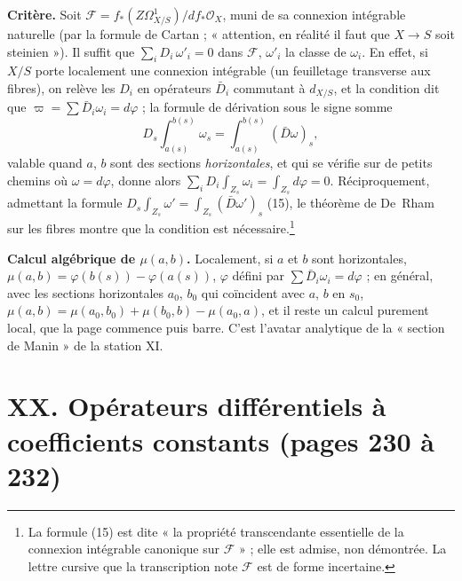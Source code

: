 \documentclass[11pt,a4paper]{article}
\begin{document}
\textbf{Critère.} Soit $\mathcal{F} = f_*(Z\Omega^1_{X/S})/d f_*\mathcal{O}_X$, muni de
sa connexion intégrable naturelle (par la formule de Cartan ; « attention,
en réalité il faut que $X \to S$ soit steinien »). Il suffit que
$\sum_i D_i\,\omega'_i = 0$ dans $\mathcal{F}$, $\omega'_i$ la classe de
$\omega_i$. En effet, si $X/S$ porte localement une connexion intégrable
(un feuilletage transverse aux fibres), on relève les $D_i$ en opérateurs
$\bar D_i$ commutant à $d_{X/S}$, et la condition dit que $\varpi = \sum \bar
D_i\omega_i = d\varphi$ ; la formule de dérivation sous le signe somme
\[
  D_s\int_{a(s)}^{b(s)}\omega_s = \int_{a(s)}^{b(s)} (\bar D\omega)_s ,
\]
valable quand $a$, $b$ sont des sections \emph{horizontales}, et qui se
vérifie sur de petits chemins où $\omega = d\varphi$, donne alors
$\sum_i D_i \int_{Z_s}\omega_i = \int_{Z_s}d\varphi = 0$. Réciproquement,
admettant la formule $D_s\int_{Z_s}\omega' = \int_{Z_s}(\bar D\omega')_s$
(15), le théorème de De~Rham sur les fibres montre que la condition est
nécessaire.\footnote{La formule (15) est dite « la propriété transcendante
essentielle de la connexion intégrable canonique sur $\mathcal{F}$ » ; elle est
admise, non démontrée. La lettre cursive que la transcription note
$\mathcal{F}$ est de forme incertaine.}

\textbf{Calcul algébrique de $\mu(a,b)$.} Localement, si $a$ et $b$ sont
horizontales, $\mu(a,b) = \varphi(b(s)) - \varphi(a(s))$, $\varphi$ défini
par $\sum\bar D_i\omega_i = d\varphi$ ; en général, avec les sections
horizontales $a_0$, $b_0$ qui coïncident avec $a$, $b$ en $s_0$,
$\mu(a,b) = \mu(a_0,b_0) + \mu(b_0,b) - \mu(a_0,a)$, et il reste un calcul
purement local, que la page commence puis barre. C'est l'avatar analytique
de la « section de Manin » de la station XI.

\section*{XX. Opérateurs différentiels à coefficients constants (pages 230 à 232)}
\end{document}
